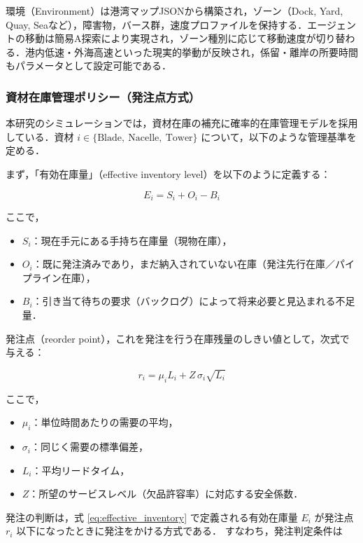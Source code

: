 \documentclass[10pt,letterpaper]{jsarticle}
\begin{document}
環境（Environment）は港湾マップJSONから構築され，ゾーン（Dock, Yard, Quay, Seaなど），障害物，バース群，速度プロファイルを保持する．エージェントの移動は簡易A\*探索により実現され，ゾーン種別に応じて移動速度が切り替わる．港内低速・外海高速といった現実的挙動が反映され，係留・離岸の所要時間もパラメータとして設定可能である．

\subsubsection*{資材在庫管理ポリシー（発注点方式）}

本研究のシミュレーションでは，資材在庫の補充に確率的在庫管理モデルを採用している．資材 \(i \in \{\mathrm{Blade},\ \mathrm{Nacelle},\ \mathrm{Tower}\}\) について，以下のような管理基準を定める．

まず，「有効在庫量」（effective inventory level）を以下のように定義する：

\begin{equation}
E_i = S_i + O_i - B_i
\label{eq:effective_inventory}
\end{equation}

ここで，  
\begin{itemize}  
  \item \(S_i\)：現在手元にある手持ち在庫量（現物在庫），  
  \item \(O_i\)：既に発注済みであり，まだ納入されていない在庫（発注先行在庫／パイプライン在庫），  
  \item \(B_i\)：引き当て待ちの要求（バックログ）によって将来必要と見込まれる不足量．  
\end{itemize}

発注点（reorder point），これを発注を行う在庫残量のしきい値として，次式で与える：

\begin{equation}
r_i = \mu_i L_i + Z\,\sigma_i \sqrt{L_i}
\label{eq:reorder_point}
\end{equation}

ここで，  
\begin{itemize}  
  \item \(\mu_i\)：単位時間あたりの需要の平均，  
  \item \(\sigma_i\)：同じく需要の標準偏差，  
  \item \(L_i\)：平均リードタイム，  
  \item \(Z\)：所望のサービスレベル（欠品許容率）に対応する安全係数．  
\end{itemize}

発注の判断は，式 \eqref{eq:effective_inventory} で定義される有効在庫量 \(E_i\) が発注点 \(r_i\) 以下になったときに発注をかける方式である．
すなわち，発注判定条件は
\end{document}
